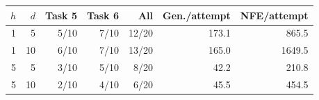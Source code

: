 \begin{tabular}{rrrrrrr}
\toprule
$h$ & $d$ & Task 5 & Task 6 & All & Gen./attempt & NFE/attempt\\
\midrule
1 & 5  & 5/10 & 7/10 & 12/20 & 173.1 & 865.5\\
1 & 10 & 6/10 & 7/10 & 13/20 & 165.0 & 1649.5\\
5 & 5  & 3/10 & 5/10 &  8/20 & 42.2  & 210.8\\
5 & 10 & 2/10 & 4/10 &  6/20 & 45.5  & 454.5\\
\bottomrule
\end{tabular}
